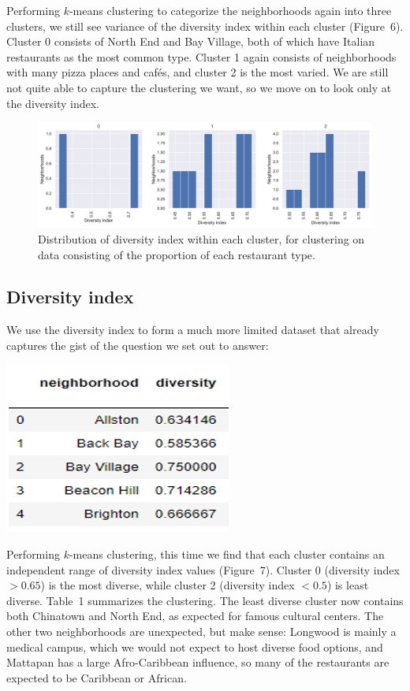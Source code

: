 \documentclass[11pt, a4paper]{article} %
\begin{document}
Performing $k$-means clustering to categorize the neighborhoods again into three clusters, we still see variance of the diversity index within each cluster (Figure~6).
Cluster 0 consists of North End and Bay Village, both of which have Italian restaurants as the most common type.
Cluster 1 again consists of neighborhoods with many pizza places and caf\'es, and cluster 2 is the most varied.
We are still not quite able to capture the clustering we want, so we move on to look only at the diversity index.
\begin{figure}
\begin{center}
\includegraphics[width=\textwidth]{hist_prop.pdf}
\end{center}
\caption{Distribution of diversity index within each cluster, for clustering on data consisting of the proportion of each restaurant type.}
\end{figure}

\subsection{Diversity index}
We use the diversity index to form a much more limited dataset that already captures the gist of the question we set out to answer:
\begin{center}
\includegraphics[]{df_diversity.png}
\end{center}

Performing $k$-means clustering, this time we find that each cluster contains an independent range of diversity index values (Figure~7).
Cluster 0 (diversity index $> 0.65$) is the most diverse, while cluster 2 (diversity index $<0.5$) is least diverse.
Table~1 summarizes the clustering.
The least diverse cluster now contains both Chinatown and North End, as expected for famous cultural centers.
The other two neighborhoods are unexpected, but make sense: Longwood is mainly a medical campus, which we would not expect to host diverse food options, and Mattapan has a large Afro-Caribbean influence, so many of the restaurants are expected to be Caribbean or African.
\end{document}

